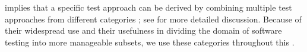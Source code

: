 implies that a specific test approach can be derived by combining multiple
test approaches from different categories\ifnotpaper
    ; see  for more detailed discussion\fi.
Because of their widespread use and their usefulness in dividing the domain of
software testing into more manageable subsets, we use these categories
throughout this \docType{}.


\ifnotpaper
    \begin{landscape}
        \begin{table*}[p]
            \ieeeCatsTable{}
        \end{table*}
    \end{landscape}
\fi

